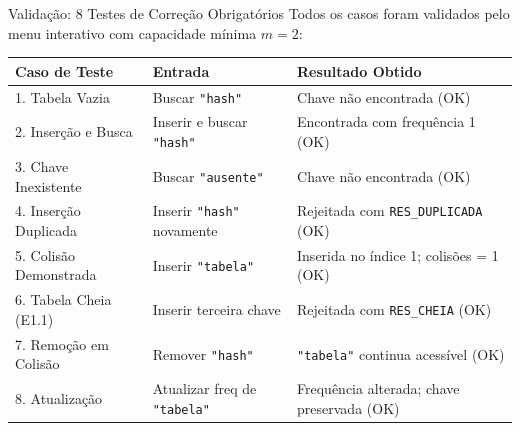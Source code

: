 \documentclass[aspectratio=169,11pt]{beamer}
\begin{document}
\begin{frame}{Validação: 8 Testes de Correção Obrigatórios}
  Todos os casos foram validados pelo menu interativo com capacidade mínima $m = 2$:

  \renewcommand{\arraystretch}{1.15}
  \scriptsize
  \begin{table}
    \centering
    \begin{tabular}{lll}
      \toprule
      \textbf{Caso de Teste} & \textbf{Entrada} & \textbf{Resultado Obtido} \\
      \midrule
      1. Tabela Vazia         & Buscar \texttt{"hash"}              & Chave não encontrada (OK) \\
      2. Inserção e Busca     & Inserir e buscar \texttt{"hash"}    & Encontrada com frequência 1 (OK) \\
      3. Chave Inexistente    & Buscar \texttt{"ausente"}           & Chave não encontrada (OK) \\
      4. Inserção Duplicada   & Inserir \texttt{"hash"} novamente   & Rejeitada com \texttt{RES\_DUPLICADA} (OK) \\
      5. Colisão Demonstrada  & Inserir \texttt{"tabela"}           & Inserida no índice 1; colisões = 1 (OK) \\
      6. Tabela Cheia (E1.1)  & Inserir terceira chave              & Rejeitada com \texttt{RES\_CHEIA} (OK) \\
      7. Remoção em Colisão   & Remover \texttt{"hash"}             & \texttt{"tabela"} continua acessível (OK) \\
      8. Atualização          & Atualizar freq de \texttt{"tabela"} & Frequência alterada; chave preservada (OK) \\
      \bottomrule
    \end{tabular}
  \end{table}
\end{frame}
\end{document}
